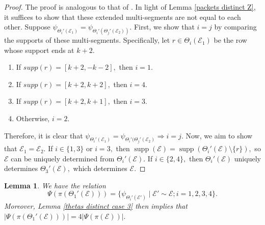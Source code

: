 \documentclass[11pt,letterpaper]{amsart}
\newcommand{\EE}{\mathcal{E}}
\renewcommand{\implies}{\Rightarrow}
\newtheorem{lemma}[thm]{Lemma}
\DeclareMathOperator{\supp}{supp}
\numberwithin{equation}{section}
\begin{document}
\begin{proof}
    The proof is analogous to that of \cite[Lemma 6.7]{HKT26}. In light of Lemma \ref{packets distinct Z}, it suffices to show that these extended multi-segments are not equal to each other. Suppose $\psi_{\Theta_i'(\mathcal{E}_1)} = \psi_{\Theta_i'(\Theta_j'(\mathcal{E}_2))}.$ First, we show that $i = j$ by comparing the supports of these multi-segments. Specifically, let $r \in \Theta_i(\mathcal{E}_1)$ be the row whose support ends at $k + 2.$
    \begin{enumerate}
        \item If $supp(r) = [k + 2, -k - 2],$ then $i = 1.$
        \item If $supp(r) = [k + 2, k + 2],$ then $i = 4.$
        \item If $supp(r) = [k + 2, k + 1],$ then $i = 3.$
        \item Otherwise, $i = 2.$
    \end{enumerate}

    Therefore, it is clear that $\psi_{\Theta_i'(\mathcal{E}_1)} = \psi_{\Theta_i'(\Theta_j'(\mathcal{E}_2)} \implies i = j.$ Now, we aim to show that $\mathcal{E}_1 = \mathcal{E}_2.$ If $i \in \{1, 3\}$ or $i = 3,$ then $\supp(\mathcal{E}) = \supp(\Theta_i'(\mathcal{E}) \setminus \{r\}),$ so $\mathcal{E}$ can be uniquely determined from $\Theta_i'(\mathcal{E}).$ If $i \in \{2, 4\},$ then $\Theta_i'(\mathcal{E})$ uniquely determines $\Theta_3'(\mathcal{E}),$ which determines $\mathcal{E}.$
\end{proof}

\begin{lemma}
\label{times 4 relation}
    We have the relation $$\Psi(\pi(\Theta_1'(\mathcal{E}))) = \{\psi_{\Theta_i'(\EE')} \mid \mathcal{E}' \sim \mathcal{E}; i = 1, 2, 3, 4 \}.$$
    Moreover, Lemma \ref{thetas distinct case 3} then implies that $|\Psi(\pi(\Theta_1'(\mathcal{E})))| = 4 |\Psi(\pi(\mathcal{E}))|.$
\end{lemma}
\end{document}
